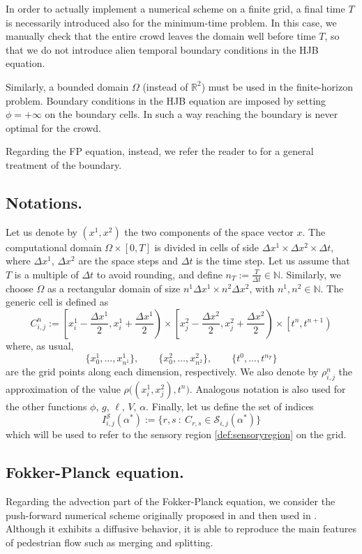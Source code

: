\documentclass{cmslatex}
\newcommand{\R}{\mathbb{R}}
\newcommand{\alphastar}{\alpha^*}
\renewcommand{\r}{\rho}
\newcommand{\Dx}{\Delta x^1}
\newcommand{\Dy}{\Delta x^2}
\newcommand{\Dt}{\Delta t}
\begin{document}
In order to actually implement a numerical scheme on a finite grid, a final time $T$ is necessarily introduced also for the minimum-time problem. In this case, we manually check that the entire crowd leaves the domain well before time $T$, so that we do not introduce alien temporal boundary conditions in the HJB equation.

Similarly, a bounded domain $\Omega$ (instead of $\R^2$) must be used in the finite-horizon problem. Boundary conditions in the HJB equation are imposed by setting $\phi=+\infty$ on the boundary cells. 
In such a way reaching the boundary is never optimal for the crowd.

Regarding the FP equation, instead, we refer the reader to \cite{cristiani2017} for a general treatment of the boundary.

\subsection{Notations.}
Let us denote by $(x^1,x^2)$ the two components of the space vector $x$.
The computational domain $\Omega\times[0,T]$ is divided in cells of side $\Dx \times \Dy \times \Dt$, where $\Dx$, $\Dy$ are the space steps and $\Dt$ is the time step. 
Let us assume that $T$ is a multiple of $\Dt$ to avoid rounding, and define $n_T:=\frac{T}{\Dt}\in\mathbb N$. 
Similarly, we choose $\Omega$ as a rectangular domain of size $n^1\Dx\times n^2\Dy$, with $n^1, n^2\in\mathbb N$.
The generic cell is defined as 
$$
C^n_{i,j}:=
\left[x^1_i-\frac{\Dx}{2}, x^1_i+\frac{\Dx}{2}\right) \times 
\left[x^2_j-\frac{\Dy}{2}, x^2_j+\frac{\Dy}{2}\right) 
\times \left[t^n, t^{n+1}\right)
$$ 
where, as usual,
$$
\{x^1_0,\ldots,x^1_{n^1}\},\qquad
\{x^2_0,\ldots,x^2_{n^2}\},\qquad
\{t^0,\ldots,t^{n_T}\}$$
are the grid points along each dimension, respectively.
We also denote by $\r^n_{i,j}$  the approximation of the value $\r\big((x^1_i,x^2_j),t^n\big)$. 
Analogous notation is also used for the other functions $\phi$, $g$, $\ell$, $V$, $\alpha$.
Finally, let us define the set of indices
$$
I^\mathcal S_{i,j}(\alphastar):=\{r,s \ : \ C_{r,s}\in\mathcal S_{i,j}(\alphastar)\}
$$
which will be used to refer to the sensory region \eqref{def:sensoryregion} on the grid.
%
%
\subsection{Fokker-Planck equation.}\label{sec:numerics:FP}
Regarding the advection part of the Fokker-Planck equation, we consider the push-forward numerical scheme originally proposed in \cite{piccoli2011ARMA} and then used in \cite{cristiani2017, cristiani2011, cristiani2014book}. 
Although it exhibits a diffusive behavior, it is able to reproduce the main features of pedestrian flow such as merging and splitting.
\end{document}
